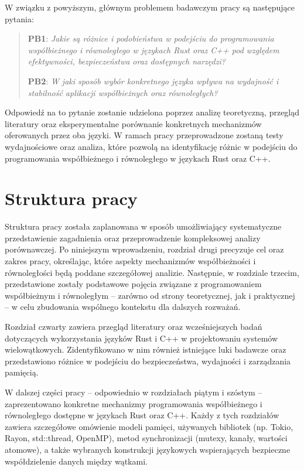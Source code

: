 W związku z powyższym, głównym problemem badawczym pracy są następujące pytania:
\begin{quote}
    \item \textbf{PB1}: 
    \emph{Jakie są różnice i podobieństwa w podejściu do programowania współbieżnego i równoległego w językach Rust oraz C++ pod względem efektywności, bezpieczeństwa oraz dostępnych narzędzi?}
    \item \textbf{PB2}:
    \emph{W jaki sposób wybór konkretnego języka wpływa na wydajność i stabilność aplikacji współbieżnych oraz równoległych?}
\end{quote}
Odpowiedź na to pytanie zostanie udzielona poprzez analizę teoretyczną, przegląd literatury oraz eksperymentalne porównanie konkretnych mechanizmów oferowanych przez oba języki. W ramach pracy przeprowadzone zostaną testy wydajnościowe oraz analiza, które pozwolą na identyfikację różnic w podejściu do programowania współbieżnego i równoległego w językach Rust oraz C++.

\section{Struktura pracy}
Struktura pracy została zaplanowana w sposób umożliwiający systematyczne przedstawienie zagadnienia oraz przeprowadzenie kompleksowej analizy porównawczej. Po niniejszym wprowadzeniu, rozdział drugi precyzuje cel oraz zakres pracy, określając, które aspekty mechanizmów współbieżności i równoległości będą poddane szczegółowej analizie. Następnie, w rozdziale trzecim, przedstawione zostały podstawowe pojęcia związane z programowaniem współbieżnym i równoległym – zarówno od strony teoretycznej, jak i praktycznej – w celu zbudowania wspólnego kontekstu dla dalszych rozważań.

Rozdział czwarty zawiera przegląd literatury oraz wcześniejszych badań dotyczących wykorzystania języków Rust i C++ w projektowaniu systemów wielowątkowych. Zidentyfikowano w nim również istniejące luki badawcze oraz przedstawiono różnice w podejściu do bezpieczeństwa, wydajności i zarządzania pamięcią.

W dalszej części pracy – odpowiednio w rozdziałach piątym i szóstym – zaprezentowano konkretne mechanizmy programowania współbieżnego i równoległego dostępne w językach Rust oraz C++. Każdy z tych rozdziałów zawiera szczegółowe omówienie modeli pamięci, używanych bibliotek (np. Tokio, Rayon, std::thread, OpenMP), metod synchronizacji (mutexy, kanały, wartości atomowe), a także wybranych konstrukcji językowych wspierających bezpieczne współdzielenie danych między wątkami.

